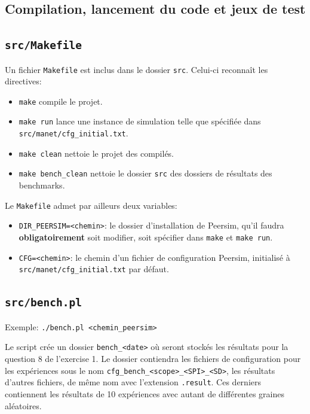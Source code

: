 \documentclass[a4paper]{article}
\begin{document}
\begin{appendix}
  \section{Compilation, lancement du code et jeux de test}
  \subsection{\texttt{src/Makefile}}
    Un fichier \texttt{Makefile} est inclus dans le dossier
    \texttt{src}. Celui-ci reconnaît les directives:
    \begin{itemize}
    \item \texttt{make} compile le projet.
    \item \texttt{make run} lance une instance de simulation telle que
      spécifiée dans \texttt{src/manet/cfg\_initial.txt}.
    \item \texttt{make clean} nettoie le projet des compilés.
    \item \texttt{make bench\_clean} nettoie le dossier \texttt{src}
      des dossiers de résultats des benchmarks.\\
    \end{itemize}

    Le \texttt{Makefile} admet par ailleurs deux variables:
    \begin{itemize}
    \item \texttt{DIR\_PEERSIM=<chemin>}: le dossier d'installation de
      Peersim, qu'il faudra \textbf{obligatoirement} soit modifier,
      soit spécifier dans \texttt{make} et \texttt{make run}.
    \item \texttt{CFG=<chemin>}: le chemin d'un fichier de
      configuration Peersim, initialisé à \texttt{src/manet/cfg\_initial.txt} par défaut.
    \end{itemize}

    \subsection{\texttt{src/bench.pl}}
    Exemple: \texttt{./bench.pl <chemin\_peersim>}

    Le script crée un dossier \texttt{bench\_<date>} où seront stockés les
    résultats pour la question 8 de l'exercise 1. Le dossier contiendra
    les fichiers de configuration pour les expériences sous le nom
    \texttt{cfg\_bench\_<scope>\_<SPI>\_<SD>}, les résultats d'autres
    fichiers, de même nom avec l'extension \texttt{.result}. Ces derniers contiennent les résultats de 10 expériences avec autant de différentes graines aléatoires.


\end{appendix}
\end{document}
